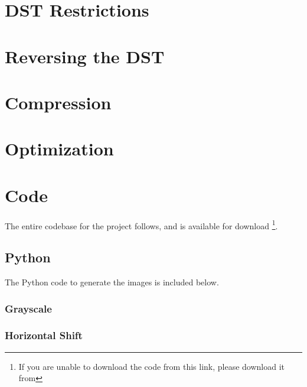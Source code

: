 \documentclass[10pt]{report}
\begin{document}
\section{DST Restrictions}

\section{Reversing the DST}

\section{Compression}

\section{Optimization}

\newpage

\appendix

\section{Code}

The entire codebase for the project follows, and is available for download \footnote{If you are unable to download the code from this link, please download it from }.

    \subsection{Python}

    The Python code to generate the images is included below.

        \subsubsection{Grayscale}
        

        \subsubsection{Horizontal Shift}
        
\end{document}
